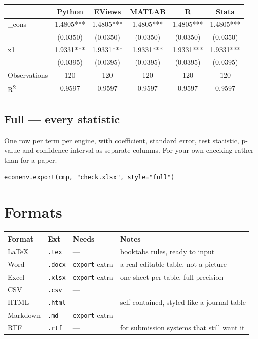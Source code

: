 \documentclass[11pt,a4paper]{report}
\begin{document}
\begin{center}
\begin{tabular}{@{}lccccc@{}}
\toprule
 & Python & EViews & MATLAB & R & Stata \\
\midrule
\_cons & 1.4805*** & 1.4805*** & 1.4805*** & 1.4805*** & 1.4805*** \\
 & (0.0350) & (0.0350) & (0.0350) & (0.0350) & (0.0350) \\
x1 & 1.9331*** & 1.9331*** & 1.9331*** & 1.9331*** & 1.9331*** \\
 & (0.0395) & (0.0395) & (0.0395) & (0.0395) & (0.0395) \\
Observations & 120 & 120 & 120 & 120 & 120 \\
R\textsuperscript{2} & 0.9597 & 0.9597 & 0.9597 & 0.9597 & 0.9597 \\
\bottomrule
\end{tabular}
\end{center}

\subsection*{Full --- every statistic}

One row per term per engine, with coefficient, standard error, test statistic,
p-value and confidence interval as separate columns. For your own checking
rather than for a paper.

\begin{lstlisting}
econenv.export(cmp, "check.xlsx", style="full")
\end{lstlisting}

\section{Formats}

\begin{center}
\begin{tabular}{@{}lllp{5.0cm}@{}}
\toprule
\textbf{Format} & \textbf{Ext} & \textbf{Needs} & \textbf{Notes} \\
\midrule
LaTeX & \texttt{.tex} & --- & booktabs rules, ready to input \\
Word & \texttt{.docx} & \texttt{export} extra & a real editable table, not a picture \\
Excel & \texttt{.xlsx} & \texttt{export} extra & one sheet per table, full precision \\
CSV & \texttt{.csv} & --- & \\
HTML & \texttt{.html} & --- & self-contained, styled like a journal table \\
Markdown & \texttt{.md} & \texttt{export} extra & \\
RTF & \texttt{.rtf} & --- & for submission systems that still want it \\
\bottomrule
\end{tabular}
\end{center}
\end{document}
